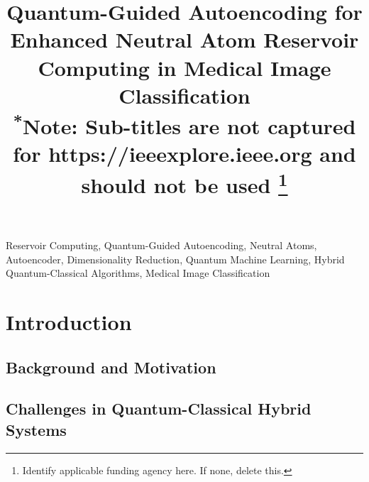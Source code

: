 \documentclass[conference]{IEEEtran}
\begin{document}
\title{Quantum-Guided Autoencoding for Enhanced Neutral Atom Reservoir Computing in Medical Image Classification\\
{\footnotesize \textsuperscript{*}Note: Sub-titles are not captured for https://ieeexplore.ieee.org  and
should not be used}
\thanks{Identify applicable funding agency here. If none, delete this.}
}

\author{

\and
{}
}

\maketitle


\begin{abstract}
\end{abstract}


\begin{IEEEkeywords}
Reservoir Computing, Quantum-Guided Autoencoding,
Neutral Atoms, Autoencoder, Dimensionality Reduction, 
Quantum Machine Learning, Hybrid Quantum-Classical Algorithms, 
Medical Image Classification
\end{IEEEkeywords}

\section{Introduction}


\subsection{Background and Motivation}


\subsection{Challenges in Quantum-Classical Hybrid Systems}
\end{document}
